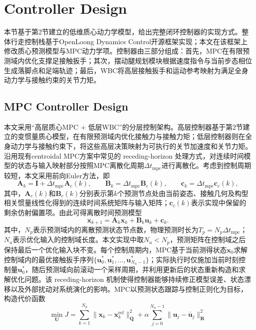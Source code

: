 ﻿\documentclass[preprint,12pt]{elsarticle}
\begin{document}
\section{Controller Design}
本节基于第2节建立的低维质心动力学模型，给出完整闭环控制器的实现方式。整体行走控制栈基于OpenLoong Dynamics Control开源框架实现\cite{refOpenLoong}；本文在该框架上修改质心预测模型与MPC动力学项。控制器由三部分组成：首先，MPC在有限预测域内优化支撑足接触扳手；其次，摆动腿规划模块根据速度指令与当前步态相位生成落脚点和足端轨迹；最后，WBC将高层接触扳手和运动参考映射为满足全身动力学与接触约束的关节力矩。

\subsection{MPC Controller Design}
本文采用“高层质心MPC + 低层WBC”的分层控制架构。高层控制器基于第2节建立的变惯量质心模型，在有限预测域内优化接触力与接触力矩；低层控制器则在全身动力学与接触约束下，将这些高层决策映射为可执行的关节加速度和关节力矩。沿用现有centroidal MPC方案中常见的 receding-horizon 处理方式，对连续时间模型的状态与输入映射部分按照MPC离散化周期$\Delta t_{\mathrm{mpc}}$进行离散化。考虑到控制周期较短，本文采用前向Euler方法，即
\begin{equation}
\bm A_k=\bm I+\Delta t_{\mathrm{mpc}}\bm A_c(k),\qquad
\bm B_k=\Delta t_{\mathrm{mpc}}\bm B_c(k),\qquad
\bm c_k=\Delta t_{\mathrm{mpc}}\bm c_c(k),
\label{eq:euler_disc}
\end{equation}
其中，$\bm A_c(k)$和$\bm B_c(k)$分别表示第$k$个预测节点处由当前姿态、接触几何及构型相关惯量线性化得到的连续时间系统矩阵与输入矩阵；$\bm c_c(k)$表示实现中保留的剩余仿射偏置项。由此可得离散时间预测模型\begin{equation}
\bm x_{k+1}=\bm A_k\bm x_k+\bm B_k\bm u_k+\bm c_k.
\label{eq:disc}
\end{equation}
其中，$N_p$表示预测域内的离散预测状态节点数，物理预测时长为$T_p=N_p\Delta t_{\mathrm{mpc}}$；$N_u$表示优化输入的控制域长度。本文实现中取$N_u<N_p$，预测矩阵在控制域之后保持最后一个优化输入块不变。每个控制周期内，MPC基于当前测得状态$\bm x_0$求解控制域内的最优接触扳手序列$\{\bm u_0^\ast,\bm u_1^\ast,\ldots,\bm u_{N_u-1}^\ast\}$；实际执行时仅施加当前时刻控制量$\bm u_0^\ast$，随后预测域向前滚动一个采样周期，并利用更新后的状态重新构造和求解优化问题。该 receding-horizon 机制使得控制器能够持续修正模型误差、状态漂移以及外部扰动对系统演化的影响。MPC以预测状态跟踪与控制正则化为目标，构造代价函数\begin{equation}
\displaystyle
\min_{\bm U} J=\sum_{k=1}^{N_p}\|\bm x_k-\bm x_k^{\text{ref}}\|_{\bm Q}^2+
\alpha\sum_{j=0}^{N_u-1}\|\bm u_j-\bar{\bm u}_j\|_{\bm R}^2
\label{eq:cost}
\end{equation}
\end{document}

